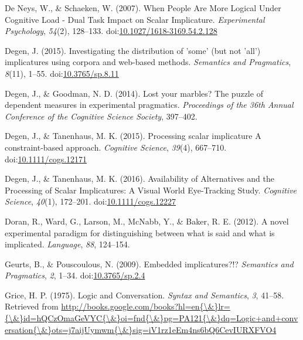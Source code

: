 \documentclass[floatsintext,man]{apa6}
\theoremstyle{definition}
\theoremstyle{definition}
\theoremstyle{definition}
\theoremstyle{remark}
\begin{document}
\hypertarget{ref-DeNeys2007}{}
De Neys, W., \& Schaeken, W. (2007). When People Are More Logical Under
Cognitive Load - Dual Task Impact on Scalar Implicature.
\emph{Experimental Psychology}, \emph{54}(2), 128--133.
doi:\href{https://doi.org/10.1027/1618-3169.54.2.128}{10.1027/1618-3169.54.2.128}

\hypertarget{ref-Degen2015}{}
Degen, J. (2015). Investigating the distribution of 'some' (but not
'all') implicatures using corpora and web-based methods. \emph{Semantics
and Pragmatics}, \emph{8}(11), 1--55.
doi:\href{https://doi.org/10.3765/sp.8.11}{10.3765/sp.8.11}

\hypertarget{ref-Degen2014}{}
Degen, J., \& Goodman, N. D. (2014). Lost your marbles? The puzzle of
dependent measures in experimental pragmatics. \emph{Proceedings of the
36th Annual Conference of the Cognitive Science Society}, 397--402.

\hypertarget{ref-DegenTanenhaus2015}{}
Degen, J., \& Tanenhaus, M. K. (2015). Processing scalar implicature A
constraint-based approach. \emph{Cognitive Science}, \emph{39}(4),
667--710.
doi:\href{https://doi.org/10.1111/cogs.12171}{10.1111/cogs.12171}

\hypertarget{ref-DegenTanenhaus2016}{}
Degen, J., \& Tanenhaus, M. K. (2016). Availability of Alternatives and
the Processing of Scalar Implicatures: A Visual World Eye-Tracking
Study. \emph{Cognitive Science}, \emph{40}(1), 172--201.
doi:\href{https://doi.org/10.1111/cogs.12227}{10.1111/cogs.12227}

\hypertarget{ref-Doran2012}{}
Doran, R., Ward, G., Larson, M., McNabb, Y., \& Baker, R. E. (2012). A
novel experimental paradigm for distinguishing between what is said and
what is implicated. \emph{Language}, \emph{88}, 124--154.

\hypertarget{ref-Geurts2009}{}
Geurts, B., \& Pouscoulous, N. (2009). Embedded implicatures?!?
\emph{Semantics and Pragmatics}, \emph{2}, 1--34.
doi:\href{https://doi.org/10.3765/sp.2.4}{10.3765/sp.2.4}

\hypertarget{ref-grice1975}{}
Grice, H. P. (1975). Logic and Conversation. \emph{Syntax and
Semantics}, \emph{3}, 41--58. Retrieved from
\href{http://books.google.com/books?hl=en\%7B/\&\%7Dlr=\%7B/\&\%7Did=hQCzOmaGeVYC\%7B/\&\%7Doi=fnd\%7B/\&\%7Dpg=PA121\%7B/\&\%7Ddq=Logic+and+conversation\%7B/\&\%7Dots=j7aijUymwm\%7B/\&\%7Dsig=iV1rz1eEm4ns6bQ6CevIURXFVO4}{http://books.google.com/books?hl=en\{\textbackslash{}\&\}lr=\{\textbackslash{}\&\}id=hQCzOmaGeVYC\{\textbackslash{}\&\}oi=fnd\{\textbackslash{}\&\}pg=PA121\{\textbackslash{}\&\}dq=Logic+and+conversation\{\textbackslash{}\&\}ots=j7aijUymwm\{\textbackslash{}\&\}sig=iV1rz1eEm4ns6bQ6CevIURXFVO4}
\end{document}
